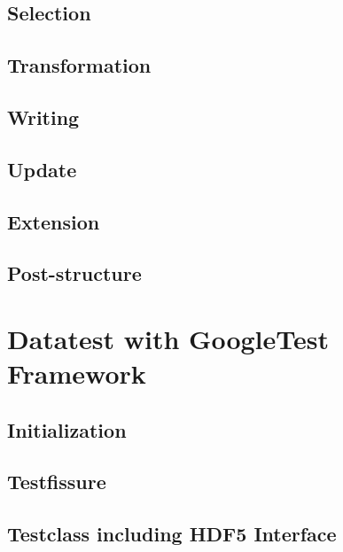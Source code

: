 \documentclass{article}
\begin{document}
\subsection{Selection}
\subsection{Transformation}
\subsection{Writing}
\subsection{Update}
\subsection{Extension}
\subsection{Post-structure}



\section{Datatest with GoogleTest Framework}
\subsection{Initialization}
\subsection{Testfissure}
\subsection{Testclass including HDF5 Interface}






\end{document}

